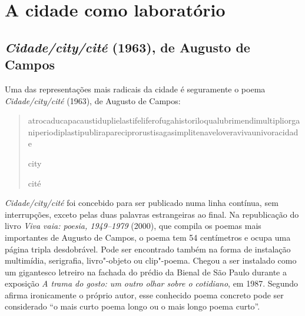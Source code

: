 \part{A cidade como laboratório}

\chapter{\emph{Cidade/city/cité} (1963), de Augusto de Campos}

Uma das representações mais radicais da cidade é seguramente o poema
\emph{Cidade/city/cité} (1963), de Augusto de Campos:

\begin{quote}
atrocaducapacaustiduplielastifeliferofugahistoriloqualubrimendimultipliorganiperiodiplastipublirapareciprorustisagasimplitenaveloveravivaunivoracidade

\hfill{city}

\hfill{cité}
\end{quote}

\emph{Cidade/city/cité} foi concebido para ser publicado numa linha
contínua, sem interrupções, exceto pelas duas palavras estrangeiras ao
final. Na republicação do livro \emph{Viva vaia: poesia, 1949--1979}
(2000), que compila os poemas mais importantes de Augusto de Campos, o
poema tem 54 centímetros e ocupa uma página tripla desdobrável. Pode ser
encontrado também na forma de instalação multimídia, serigrafia,
livro"-objeto ou clip"-poema. Chegou a ser instalado como um
gigantesco letreiro na fachada do prédio da Bienal de São Paulo durante
a exposição \emph{A trama do gosto: um outro olhar sobre o cotidiano},
em 1987. Segundo afirma ironicamente o próprio autor, esse conhecido
poema concreto pode ser considerado ``o mais curto poema longo ou o mais
longo poema curto''.

